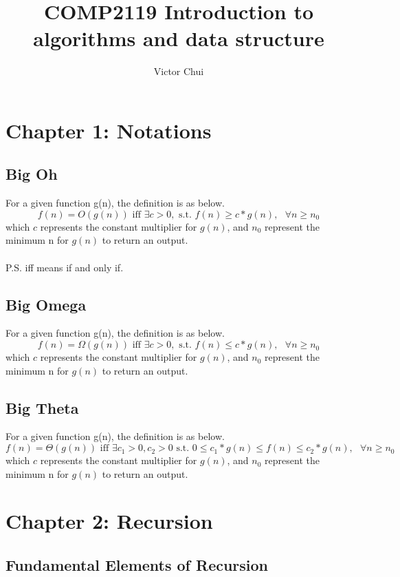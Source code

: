 \documentclass{article}
\title{COMP2119 Introduction to algorithms and data structure}
\author{Victor Chui}
\begin{document}
\maketitle

\section{Chapter 1: Notations}
\subsection{Big Oh}
For a given function g(n), the definition is as below.
\begin{equation*}
	f(n) = O(g(n)) \text{ iff } \exists c > 0 ,\text{ s.t. } f(n) \geq c * g(n), \text{ }\forall n \geq n_0
\end{equation*}
which $c$ represents the constant multiplier for $g(n)$, and $n_0$
represent the minimum n for $g(n)$ to return an output. \\\\
P.S. iff means if and only if.
\subsection{Big Omega}
For a given function g(n), the definition is as below.
\begin{equation*}
	f(n) = \Omega(g(n)) \text{ iff } \exists c > 0 ,\text{ s.t. } f(n) \leq c * g(n), \text{ }\forall n \geq n_0
\end{equation*}
which $c$ represents the constant multiplier for $g(n)$, and $n_0$
represent the minimum n for $g(n)$ to return an output.
\subsection{Big Theta}
For a given function g(n), the definition is as below.
\begin{equation*}
	f(n) = \Theta(g(n)) \text{ iff } \exists c_1 > 0 , c_2 > 0\text{ s.t. } 0 \leq c_1 * g(n) \leq f(n) \leq c_2 * g(n), \text{ }\forall n \geq n_0
\end{equation*}
which $c$ represents the constant multiplier for $g(n)$, and $n_0$
represent the minimum n for $g(n)$ to return an output.


\section{Chapter 2: Recursion}
\subsection{Fundamental Elements of Recursion}
\end{document}
